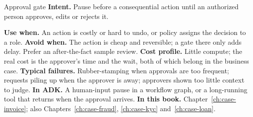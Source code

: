 \begin{patterncard}{Approval gate}
\textbf{Intent.} Pause before a consequential action until an authorized person approves, edits or rejects it.\par\smallskip
\begin{center}
\end{center}
\textbf{Use when.} An action is costly or hard to undo, or policy assigns the decision to a role.
\textbf{Avoid when.} The action is cheap and reversible; a gate there only adds delay. Prefer an after-the-fact sample review.
\textbf{Cost profile.} Little compute; the real cost is the approver's time and the wait, both of which belong in the business case.
\textbf{Typical failures.} Rubber-stamping when approvals are too frequent; requests piling up when the approver is away; approvers shown too little context to judge.
\textbf{In ADK.} A human-input pause in a workflow graph, or a long-running tool that returns when the approval arrives.
\textbf{In this book.} Chapter~\ref{ch:case-invoice}; also Chapters~\ref{ch:case-fraud}, \ref{ch:case-kyc} and~\ref{ch:case-loan}.
\end{patterncard}

